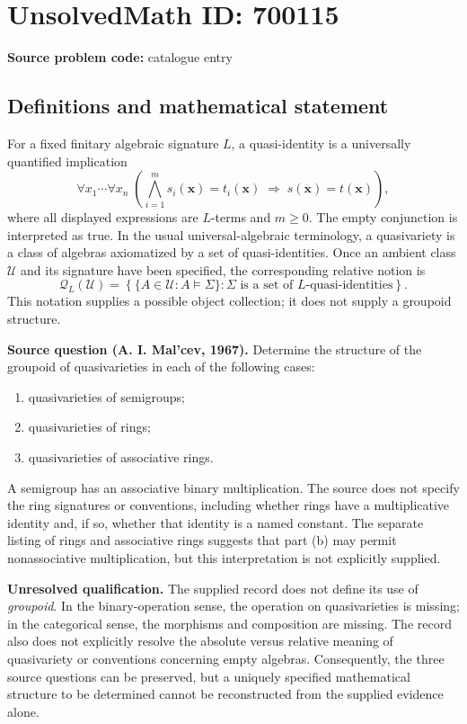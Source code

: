 \documentclass[11pt]{article}
\begin{document}
\section*{UnsolvedMath ID: 700115}
\textbf{Source problem code:} catalogue entry
\subsection{Definitions and mathematical statement}
For a fixed finitary algebraic signature \(L\), a quasi-identity is a universally quantified implication
\[
\forall x_1\cdots\forall x_n\;\left(\bigwedge_{i=1}^{m}s_i(\mathbf{x})=t_i(\mathbf{x})\;\Longrightarrow\;s(\mathbf{x})=t(\mathbf{x})\right),
\]
where all displayed expressions are \(L\)-terms and \(m\geq 0\). The empty conjunction is interpreted as true. In the usual universal-algebraic terminology, a quasivariety is a class of algebras axiomatized by a set of quasi-identities. Once an ambient class \(\mathcal U\) and its signature have been specified, the corresponding relative notion is
\[
\mathcal Q_L(\mathcal U)=\left\{\{A\in\mathcal U:A\models\Sigma\}:\Sigma\text{ is a set of }L\text{-quasi-identities}\right\}.
\]
This notation supplies a possible object collection; it does not supply a groupoid structure.

\textbf{Source question (A. I. Mal'cev, 1967).} Determine the structure of the groupoid of quasivarieties in each of the following cases:
\begin{enumerate}
\item[(a)] quasivarieties of semigroups;
\item[(b)] quasivarieties of rings;
\item[(c)] quasivarieties of associative rings.
\end{enumerate}
A semigroup has an associative binary multiplication. The source does not specify the ring signatures or conventions, including whether rings have a multiplicative identity and, if so, whether that identity is a named constant. The separate listing of rings and associative rings suggests that part (b) may permit nonassociative multiplication, but this interpretation is not explicitly supplied.

\textbf{Unresolved qualification.} The supplied record does not define its use of \emph{groupoid}. In the binary-operation sense, the operation on quasivarieties is missing; in the categorical sense, the morphisms and composition are missing. The record also does not explicitly resolve the absolute versus relative meaning of quasivariety or conventions concerning empty algebras. Consequently, the three source questions can be preserved, but a uniquely specified mathematical structure to be determined cannot be reconstructed from the supplied evidence alone.
\end{document}
